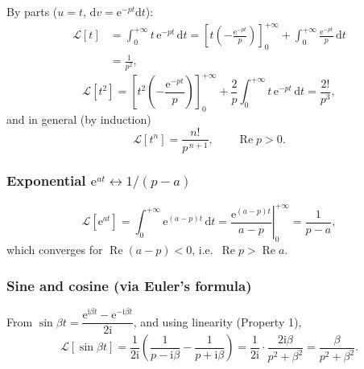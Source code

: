 \documentclass[11pt,a4paper]{article}
\theoremstyle{definition}
\theoremstyle{plain}
\begin{document}
By parts ($u=t$, $\mathrm{d}v=\mathrm{e}^{-pt}\mathrm{d}t$):
\begin{equation}
\begin{split}
\mathcal{L}\left[t\right]&=\int_{0}^{+\infty} t\,\mathrm{e}^{-pt}\,\mathrm{d}t
=\left[t\left(-\frac{\mathrm{e}^{-pt}}{p}\right)\right]_{0}^{+\infty}
+\int_{0}^{+\infty}\frac{\mathrm{e}^{-pt}}{p}\,\mathrm{d}t\\
&=\frac{1}{p^{2}},
\end{split}
\tag{16.10}
\end{equation}
\begin{equation}
\mathcal{L}\left[t^{2}\right]=\left[t^{2}\left(-\frac{\mathrm{e}^{-pt}}{p}\right)\right]_{0}^{+\infty}
+\frac{2}{p}\int_{0}^{+\infty} t\,\mathrm{e}^{-pt}\,\mathrm{d}t=\frac{2!}{p^{3}}, \tag{16.11}
\end{equation}
and in general (by induction)
\begin{equation}
\mathcal{L}\left[t^{n}\right]=\frac{n!}{p^{\,n+1}},\qquad \operatorname{Re}p>0 . \tag{16.12}
\end{equation}

\subsubsection{Exponential $\mathrm{e}^{at}\leftrightarrow 1/(p-a)$}

\begin{equation}
\mathcal{L}\left[\mathrm{e}^{at}\right]=\int_{0}^{+\infty}\mathrm{e}^{(a-p)t}\,\mathrm{d}t
=\left.\frac{\mathrm{e}^{(a-p)t}}{a-p}\right|_{0}^{+\infty}=\frac{1}{p-a}, \tag{16.13}
\end{equation}
which converges for $\operatorname{Re}(a-p)<0$, i.e.\ $\operatorname{Re}p>\operatorname{Re}a$.

\clearpage
\subsubsection{Sine and cosine (via Euler's formula)}

From $\sin\beta t=\dfrac{\mathrm{e}^{\mathrm{i}\beta t}-\mathrm{e}^{-\mathrm{i}\beta t}}{2\mathrm{i}}$,
and using linearity (Property 1),
\begin{equation}
\mathcal{L}\left[\sin\beta t\right]
=\frac{1}{2\mathrm{i}}\left(\frac{1}{p-\mathrm{i}\beta}-\frac{1}{p+\mathrm{i}\beta}\right)
=\frac{1}{2\mathrm{i}}\cdot\frac{2\mathrm{i}\beta}{p^{2}+\beta^{2}}
=\frac{\beta}{p^{2}+\beta^{2}} . \tag{16.14}
\end{equation}
\end{document}
